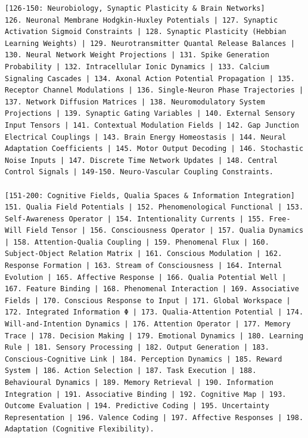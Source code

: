 \documentclass[11pt,a4paper]{article}
\begin{document}
\begin{tcolorbox}
\begin{lstlisting}[basicstyle=\scriptsize\ttfamily, breaklines=true, columns=fullflexible]
[126-150: Neurobiology, Synaptic Plasticity & Brain Networks]
126. Neuronal Membrane Hodgkin-Huxley Potentials | 127. Synaptic Activation Sigmoid Constraints | 128. Synaptic Plasticity (Hebbian Learning Weights) | 129. Neurotransmitter Quantal Release Balances | 130. Neural Network Weight Projections | 131. Spike Generation Probability | 132. Intracellular Ionic Dynamics | 133. Calcium Signaling Cascades | 134. Axonal Action Potential Propagation | 135. Receptor Channel Modulations | 136. Single-Neuron Phase Trajectories | 137. Network Diffusion Matrices | 138. Neuromodulatory System Projections | 139. Synaptic Gating Variables | 140. External Sensory Input Tensors | 141. Contextual Modulation Fields | 142. Gap Junction Electrical Couplings | 143. Brain Energy Homeostasis | 144. Neural Adaptation Coefficients | 145. Motor Output Decoding | 146. Stochastic Noise Inputs | 147. Discrete Time Network Updates | 148. Central Control Signals | 149-150. Neuro-Vascular Coupling Constraints.

[151-200: Cognitive Fields, Qualia Spaces & Information Integration]
151. Qualia Field Potentials | 152. Phenomenological Functional | 153. Self-Awareness Operator | 154. Intentionality Currents | 155. Free-Will Field Tensor | 156. Consciousness Operator | 157. Qualia Dynamics | 158. Attention-Qualia Coupling | 159. Phenomenal Flux | 160. Subject-Object Relation Matrix | 161. Conscious Modulation | 162. Response Formation | 163. Stream of Consciousness | 164. Internal Evolution | 165. Affective Response | 166. Qualia Potential Well | 167. Feature Binding | 168. Phenomenal Interaction | 169. Associative Fields | 170. Conscious Response to Input | 171. Global Workspace | 172. Integrated Information Φ | 173. Qualia-Attention Potential | 174. Will-and-Intention Dynamics | 176. Attention Operator | 177. Memory Trace | 178. Decision Making | 179. Emotional Dynamics | 180. Learning Rule | 181. Sensory Processing | 182. Output Generation | 183. Conscious-Cognitive Link | 184. Perception Dynamics | 185. Reward System | 186. Action Selection | 187. Task Execution | 188. Behavioural Dynamics | 189. Memory Retrieval | 190. Information Integration | 191. Associative Binding | 192. Cognitive Map | 193. Outcome Evaluation | 194. Predictive Coding | 195. Uncertainty Representation | 196. Valence Coding | 197. Affective Responses | 198. Adaptation (Cognitive Flexibility).


\end{lstlisting}
\end{tcolorbox}
\end{document}
